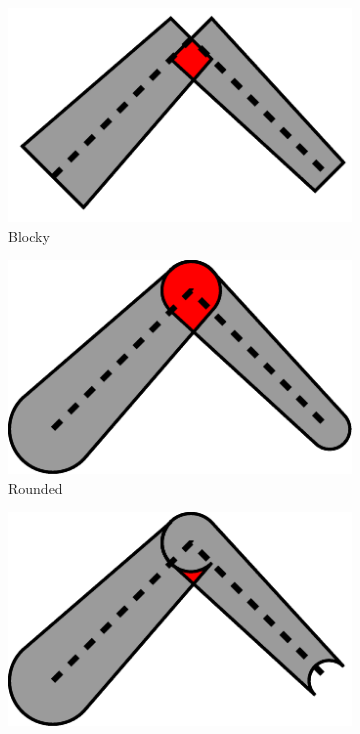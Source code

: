 \begin{figure}
\centering
\setlength{\figwidth}{.25\columnwidth}
\begin{subfigure}{\figwidth}\centering
\includegraphics[width=\columnwidth]{sources-validation-visualization-principle-blocky.pdf}
\caption{Blocky}\label{segment_visualization_blocky}
\end{subfigure}
\begin{subfigure}{\figwidth}\centering
\includegraphics[width=\columnwidth]{sources-validation-visualization-principle-rounded.pdf}
\caption{Rounded}\label{segment_visualization_rounded}
\end{subfigure}
\begin{subfigure}{\figwidth}\centering
\includegraphics[width=\columnwidth]{sources-validation-visualization-principle-rounded-excluded.pdf}

\end{subfigure}
\end{figure}
